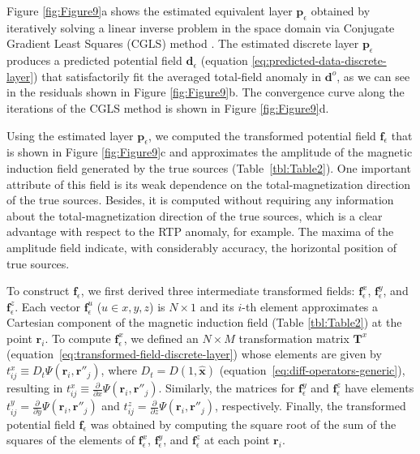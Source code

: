 \documentclass[manuscript,noblind]{geophysics}
\begin{document}
	Figure \ref{fig:Figure9}a shows the estimated equivalent layer $\mathbf{p}_{\epsilon}$ 
	obtained by iteratively solving a linear inverse problem in the space domain via 
	Conjugate Gradient Least Squares (CGLS) method \citep[][ p. 166]{aster_etal2019}. 
	The estimated discrete layer $\mathbf{p}_{\epsilon}$ produces a predicted potential 
	field $\mathbf{d}_{\epsilon}$ (equation \ref{eq:predicted-data-discrete-layer}) that 
	satisfactorily fit the averaged total-field anomaly in $\mathbf{d}^{o}$, as we can see 
	in the residuals shown in Figure \ref{fig:Figure9}b. The convergence curve along the 
	iterations of the CGLS method is shown in Figure \ref{fig:Figure9}d.
	
	Using the estimated layer $\mathbf{p}_{\epsilon}$, we computed the transformed potential field 
	$\mathbf{f}_{\epsilon}$ that is shown in Figure \ref{fig:Figure9}c and 
	approximates the amplitude of the magnetic 
	induction field generated by the true sources (Table~\ref{tbl:Table2}). 
	One important attribute of this field is its weak 
	dependence on the total-magnetization direction of the true sources. 
	Besides, it is computed without requiring any information about the total-magnetization
	direction of the true sources, which is a clear advantage with respect to the 
	RTP anomaly, for example. 
	The maxima of the amplitude field indicate, with considerably accuracy, the horizontal
	position of true sources.
	
	To construct $\mathbf{f}_{\epsilon}$, we first derived three intermediate transformed fields: 
	$\mathbf{f}^{x}_{\epsilon}$, $\mathbf{f}^{y}_{\epsilon}$, and $\mathbf{f}^{z}_{\epsilon}$. 
	Each vector $\mathbf{f}^{u}_{\epsilon}$ 
	($u \in {x, y, z}$) is $N \times 1$ and its $i$-th element approximates a Cartesian 
	component of the magnetic induction field (Table \ref{tbl:Table2}) at the point 
	$\mathbf{r}_{i}$.
	To compute $\mathbf{f}^{x}_{\epsilon}$, we defined an $N \times M$ transformation 
	matrix $\mathbf{T}^{x}$ (equation~\ref{eq:transformed-field-discrete-layer}) whose 
	elements are given by 
	$t^{x}_{ij} \equiv D_{t} \Psi(\mathbf{r}_{i}, \mathbf{r}''_{j})$, 
	where $D_{t} = D(1,\hat{\mathbf{x}})$ 
	(equation~\ref{eq:diff-operators-generic}), resulting in
	$t^{x}_{ij} \equiv \frac{\partial}{\partial x} \Psi(\mathbf{r}_{i}, \mathbf{r}''_{j})$. 
	Similarly, the matrices for $\mathbf{f}^{y}_{\epsilon}$ and $\mathbf{f}^{z}_{\epsilon}$ have 
	elements $t^{y}_{ij} = \frac{\partial}{\partial y} \Psi(\mathbf{r}_{i}, \mathbf{r}''_{j})$ and 
	$t^{z}_{ij} = \frac{\partial}{\partial z} \Psi(\mathbf{r}_{i}, \mathbf{r}''_{j})$, 
	respectively.
	Finally, the transformed potential field $\mathbf{f}_{\epsilon}$ was obtained by computing the 
	square root of the sum of the squares of the elements of $\mathbf{f}^{x}_{\epsilon}$, 
	$\mathbf{f}^{y}_{\epsilon}$, and $\mathbf{f}^{z}_{\epsilon}$ at each point $\mathbf{r}_{i}$.
	
\end{document}
